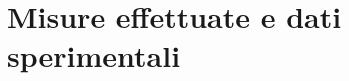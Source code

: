 \chapter{Misure effettuate e dati sperimentali}
\label{capitolo5}
\thispagestyle{empty}

\noindent %